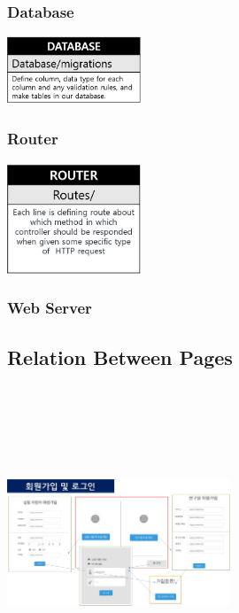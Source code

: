 \documentclass[letterpaper, 10 pt, conference]{ieeeconf}  %
\begin{document}
\subsubsection{Database\\}
\includegraphics[width = 0.3\textwidth]{Architecture/Database.png}
\subsubsection{Router\\}
\includegraphics[width = 0.3\textwidth]{Architecture/Router.png}
\subsubsection{Web Server\\}
\begin{center}
\end{center}


\subsection{Relation Between Pages}
\subsubsection{\\}
\includegraphics[width=0.5\textwidth,height = 7cm]{Oven/17_linkOfSignUpPages.png}
\end{document}
